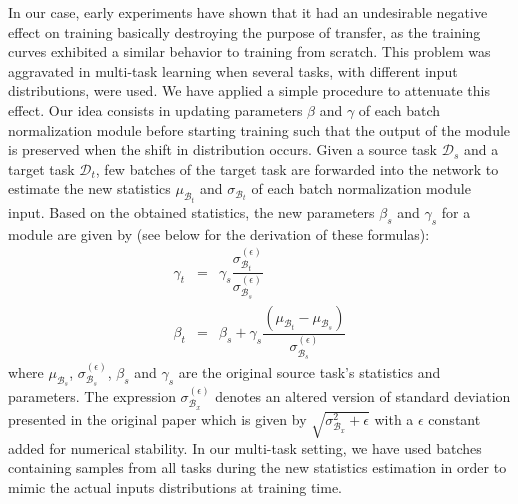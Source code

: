 In our case, early experiments have shown that it had an undesirable negative effect on training basically destroying the purpose of transfer, as the training curves exhibited a similar behavior to training from scratch. This problem was aggravated in multi-task learning when several tasks, with different input distributions, were used. We have applied a simple procedure to attenuate this effect. Our idea consists in updating parameters $\beta$ and $\gamma$ of each batch normalization module before starting training such that the output of the module is preserved when the shift in distribution occurs. Given a source task $\mathcal{D}_s$ and a target task $\mathcal{D}_t$, few batches of the target task are forwarded into the network to estimate the new statistics $\mu_{\mathcal{B}_t}$ and $\sigma_{\mathcal{B}_t}$ of each batch normalization module input. Based on the obtained statistics, the new parameters $\beta_s$ and $\gamma_s$ for a module are given by (see below for the derivation of these formulas):
\begin{eqnarray}
\gamma_t &=& \gamma_s \dfrac{\sigma^{(\epsilon)}_{\mathcal{B}_t}}{\sigma^{(\epsilon)}_{\mathcal{B}_s}}\label{app:mtask:eqn:bn_update_gamma}\\
\beta_t &=& \beta_s + \gamma_s  \dfrac{(\mu_{\mathcal{B}_t}-\mu_{\mathcal{B}_s})}{\sigma^{(\epsilon)}_{\mathcal{B}_s}}\label{app:mtask:eqn:bn_update_beta}
\end{eqnarray}
where $\mu_{\mathcal{B}_s}$, $\sigma^{(\epsilon)}_{\mathcal{B}_s}$, $\beta_s$ and $\gamma_s$ are the original source task's statistics and parameters. The expression $\sigma^{(\epsilon)}_{\mathcal{B}_x}$ denotes an altered version of standard deviation presented in the original paper which is given by $\sqrt{\sigma_{\mathcal{B}_x}^2 + \epsilon}$ with a $\epsilon$ constant added for numerical stability. In our multi-task setting, we have used batches containing samples from all tasks during the new statistics estimation in order to mimic the actual inputs distributions at training time.

